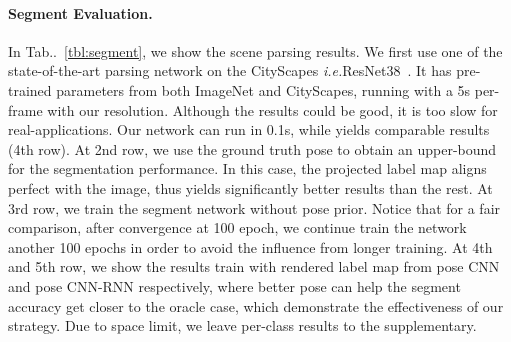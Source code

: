 \documentclass[10pt,twocolumn,letterpaper]{article}
\makeatletter
\newcommand{\tabref}[1]{Tab\onedot~\ref{#1}}
\DeclareRobustCommand\onedot{\futurelet\@let@token\@onedot}
\def\onedot{\ifx\@let@token.\else.\null\fi\xspace}
\def\ie{\emph{i.e.}}
\makeatother
\begin{document}
\paragraph{Segment Evaluation.}
In \tabref{tbl:segment}, we show the scene parsing results. We first use one of the state-of-the-art parsing network on the CityScapes \ie ResNet38~\cite{WuSH16e}. It has pre-trained parameters from both ImageNet and CityScapes, running with a 5s per-frame with our resolution. Although the results could be good, it is too slow for real-applications. Our network can run in 0.1s, while yields comparable results (4th row). At 2nd row, we use the ground truth pose to obtain an upper-bound for the segmentation performance. In this case, the projected label map aligns perfect with the image, thus yields significantly better results than the rest. At 3rd row, we train the segment network without pose prior.  Notice that for a fair comparison, after convergence at 100 epoch, we continue train the network another 100 epochs in order to avoid the influence from longer training. 
At 4th and 5th row, we show the results train with rendered label map from pose CNN and pose CNN-RNN respectively, where better pose can help the segment accuracy get closer to the oracle case, which demonstrate the effectiveness of our strategy. Due to space limit, we leave per-class results to the supplementary.
\end{document}
